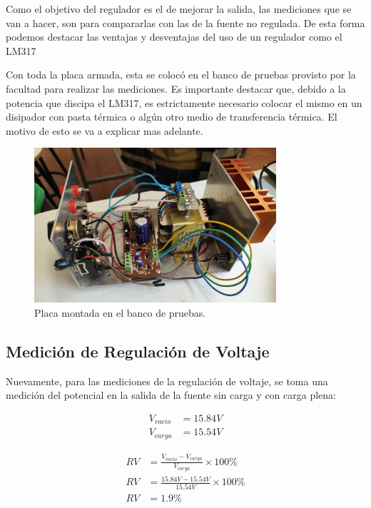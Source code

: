 \documentclass[chaptersright]{informeutn}
\begin{document}
      Como el objetivo del regulador es el de mejorar la salida, las mediciones que se van a hacer, son para
      compararlas con las de la fuente no regulada. De esta forma podemos destacar las ventajas y desventajas del uso
      de un regulador como el LM317

      Con toda la placa armada, esta se colocó en el banco de pruebas provisto por la facultad para realizar las
      mediciones. Es importante destacar que, debido a la potencia que discipa el LM317, es estrictamente necesario
      colocar el mismo en un disipador con pasta térmica o algún otro medio de transferencia térmica. El motivo de
      esto se va a explicar mas adelante.

      \begin{figure}[!h]
        \centering
        \includegraphics[width=0.8\textwidth]{pictures/reg_banco-prueb.jpeg}
        \caption{Placa montada en el banco de pruebas.}
      \end{figure}

      \subsection{Medición de Regulación de Voltaje}
        Nuevamente, para las mediciones de la regulación de voltaje, se toma una medición del potencial en la salida de
        la fuente sin carga y con carga plena:
        \begin{figure}[!h]
          \centering
          \begin{minipage}{0.4\textwidth}
            \begin{align*}
              V_{vacio} &= 15.84V\\[6pt]
              V_{carga} &= 15.54V
            \end{align*}
          \end{minipage}
          \begin{minipage}{0.4\textwidth}
            \begin{align*}
              RV &= \frac{V_{vacio} - V_{carga}}{V_{carga}} \times 100\%\\[6pt]
              RV &= \frac{15.84V - 15.54V}{15.54V} \times 100\%\\[6pt]
              RV &= 1.9\%
            \end{align*}
          \end{minipage}
        \end{figure}
\end{document}
